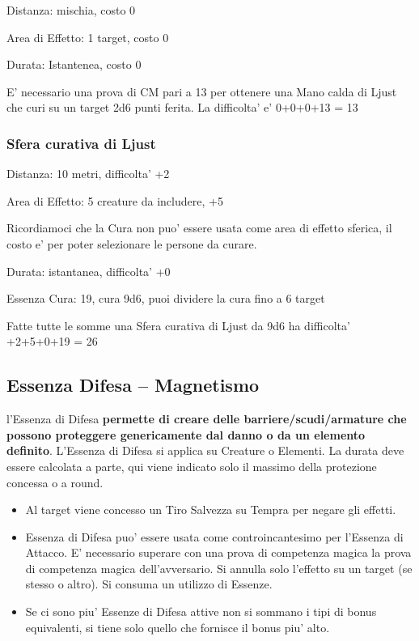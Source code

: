 \documentclass[a4paper,11pt,twoside,openany]{dndbook}
\begin{document}
Distanza: mischia, costo 0

Area di Effetto: 1 target, costo 0

Durata: Istantenea, costo 0

E’ necessario una prova di CM pari a 13 per ottenere una Mano calda di Ljust che curi su un target
2d6 punti ferita. La difficolta’ e’ 0+0+0+13 = 13

\subsubsection{Sfera curativa di Ljust}

Distanza: 10 metri, difficolta' +2

Area di Effetto: 5 creature da includere, +5

Ricordiamoci che la Cura non puo' essere usata come area di effetto sferica, il costo e' per poter selezionare le persone da curare.

Durata: istantanea, difficolta' +0

Essenza Cura: 19, cura 9d6, puoi dividere la cura fino a 6 target

Fatte tutte le somme una Sfera curativa di Ljust da 9d6 ha difficolta' +2+5+0+19 = 26

\pagebreak

\subsection{Essenza Difesa -- Magnetismo}

\label{essenza-difesa---magnetismo}

l'Essenza di Difesa \textbf{permette di creare delle barriere/scudi/armature che possono proteggere genericamente dal danno o da un elemento definito}. L'Essenza di Difesa si applica su Creature o Elementi. La durata deve essere calcolata a parte, qui viene indicato solo il massimo della protezione concessa o a round.
\begin{itemize}
\item 
Al target viene concesso un Tiro Salvezza su Tempra per negare gli effetti. 
\item 
Essenza di Difesa puo' essere usata come controincantesimo per l'Essenza di Attacco. E' necessario superare con una prova di competenza magica la prova di competenza magica dell'avversario. Si annulla solo l'effetto su un target (se stesso o altro). Si consuma un utilizzo di Essenze. 
\item 
Se ci sono piu' Essenze di Difesa attive non si sommano i tipi di bonus equivalenti, si tiene solo quello che fornisce il bonus piu' alto. 
\end{itemize}
\end{document}
